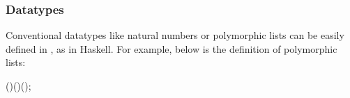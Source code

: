 \begin{comment}
Now we can evaluate some lambda expression and get the result back as
in Figure~\ref{fig:pex}

\begin{figure}[ht]
\begin{hscode}\SaveRestoreHook
\column{B}{@{}>{\hspre}l<{\hspost}@{}}%
\column{3}{@{}>{\hspre}l<{\hspost}@{}}%
\column{5}{@{}>{\hspre}l<{\hspost}@{}}%
\column{7}{@{}>{\hspre}l<{\hspost}@{}}%
\column{29}{@{}>{\hspre}l<{\hspost}@{}}%
\column{E}{@{}>{\hspre}l<{\hspost}@{}}%
\>[B]{}\mathbf{let}\;\Varid{show}\mathbin{:}\Conid{Value}\to \Varid{nat}\mathrel{=}{}\<[E]%
\\
\>[B]{}\hsindent{3}{}\<[3]%
\>[3]{}\lambda \Varid{e}\mathbin{:}\Conid{Value}.\,\mathbf{case}\;\Varid{e}\;\mathbf{of}{}\<[E]%
\\
\>[3]{}\hsindent{2}{}\<[5]%
\>[5]{}\Conid{VI}\;(\Varid{n}\mathbin{:}\Varid{nat}){}\<[29]%
\>[29]{}\Rightarrow \Varid{n}{}\<[E]%
\\
\>[B]{}\hsindent{3}{}\<[3]%
\>[3]{}\mid \Conid{VF}\;(\Varid{f}\mathbin{:}\Conid{Value}\to \Conid{Value})\Rightarrow \mathrm{10000}\mbox{\onelinecomment  impossible to reach}{}\<[E]%
\\
\>[B]{}\mathbf{in}{}\<[E]%
\\
\>[B]{}\mathbf{let}\;\Varid{example}\mathbin{:}\Conid{PLambda}\;\Conid{Value}\mathrel{=}{}\<[E]%
\\
\>[B]{}\hsindent{3}{}\<[3]%
\>[3]{}\Conid{App}\;\Conid{Value}\;{}\<[E]%
\\
\>[3]{}\hsindent{4}{}\<[7]%
\>[7]{}(\Conid{Lam}\;\Conid{Value}\;(\lambda \Varid{x}\mathbin{:}\Conid{Value}.\,\Conid{Var}\;\Conid{Value}\;\Conid{X}))\;{}\<[E]%
\\
\>[3]{}\hsindent{4}{}\<[7]%
\>[7]{}(\Conid{Num}\;\Conid{Value}\;\mathrm{42}){}\<[E]%
\\
\>[B]{}\mathbf{in}\;\Varid{show}\;(\Varid{eval}\;\Varid{example})\mbox{\onelinecomment  return 42}{}\<[E]%
\ColumnHook
\end{hscode}\resethooks
\caption{Example of using PHOAS}
\label{fig:pex}
\end{figure}
\end{comment}

\subsubsection{Datatypes}
Conventional datatypes like natural numbers or polymorphic lists can
be easily defined in \sufcc,   as in Haskell. For
example, below is the definition of polymorphic lists:
\begin{hscode}\SaveRestoreHook
{}%
%
%
\>[4]{}\;\;(\mathbin{:}\star)\mathrel{=}\mid {}\;(\mathbin{:})\;(\mathbin{:}\;);{}\<[E]%
\ColumnHook
\end{hscode}\resethooks

